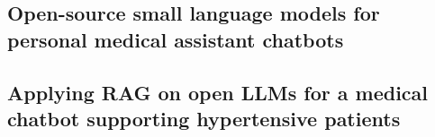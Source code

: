 \subsection{Open-source small language models for personal medical assistant chatbots}\label{subsec:open-source-small-language-models-for-personal-medical-assistant-chatbots}

\subsection{Applying \acl{RAG} on open \acp{LLM} for a medical chatbot supporting hypertensive patients}\label{subsec:applying-rag-on-open-llm-for-a-medical-chatbot-supporting-hypertensive-patients}